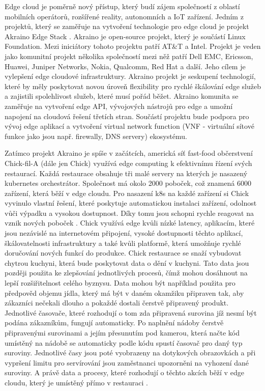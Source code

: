      Edge cloud je poměrně nový přístup, který budí zájem společností z oblastí mobilních operátorů, rozšířené reality, autonomních a IoT zařízení. Jedním z projektů, který se zaměřuje na vytvoření technologie pro edge cloud je projekt Akraino Edge Stack \cite{akraino}. Akraino je open-source projekt, který je součástí Linux Foundation. Mezi iniciátory tohoto projektu patří AT&T a Intel. Projekt je veden jako komunitní projekt několika společností mezi něž patří Dell EMC, Ericsson, Huawei, Juniper Networks, Nokia, Qualcomm, Red Hat a další. Jeho cílem je vylepšení edge cloudové infrastruktury. Akraino projekt je seskupení technologií, které by měly poskytovat novou úroveň flexibility pro rychlé škálování edge služeb a zajistili spolehlivost služeb, které musí pořád běžet. Akraino komunita se zaměřuje na vytvoření edge API, vývojových nástrojů pro edge a umožní napojení na cloudová řešení třetích stran. Součástí projektu bude podpora pro vývoj edge aplikací a vytvoření virtual network function (VNF - virtuální sítové funkce jako jsou např. firewally, DNS servery) ekosystému. \par
         Zatímco projekt Akraino je spíše v začátcích, americká síť fast-food občerstvení Chick-fil-A (dále jen Chick) využívá edge computing k efektivnímu řízení svých restaurací. Každá restaurace obsahuje tři malé servery na kterých je nasazený kubernetes orchestrátor. Společnost má okolo 2000 poboček, což znamená 6000 zařízení, která běží v edge cloudu. Pro nasazení k8s na každé zařízení si Chick vyvinulo vlastní řešení, které poskytuje automatickou instalaci zařízení, odolnost vůči výpadku a vysokou dostupnost. Díky tomu jsou schopni rychle reagovat na vznik nových poboček \cite{chick-1}. Chick využívá edge kvůli nízké latency, aplikacím, které jsou nezávislé na internetovém připojení, vysoké dostupnosti těchto aplikací, škálovatelnosti infrastruktury a také kvůli platformě, která umožňuje rychlé doručování nových funkcí do produkce. Chick restaurace se snaží vybudovat chytrou kuchyni, která bude poskytovat data o dění v kuchyni. Tato data jsou později použita ke zlepšování jednotlivých procesů, čímž mohou dosáhnout na lepší rozšiřitelnost celého byznysu. Data mohou být například použita pro předpověd objemu jídla, který má být v daném okamžiku připraven tak, aby zákazníci nečekali dlouho a pokaždé dostali čerstvě připravený produkt. Jednotlivé časovače, které rozhodují o tom zda připravená surovina jíž nesmí být podána zákazníkům, fungují automaticky. Po naplnění nádoby čerstvě připravenými surovinami a jejím přesunutím pod kamerou, která načte kód umístěný na nádobě se automaticky podle kódu spustí časovač pro daný typ suroviny. Jednotlivé časy jsou poté vyobrazeny na dotykových obrazovkách a při vypršení limitu pro servírování jsou zaměstnanci upozorněni na vyhození dané suroviny. A právě data a procesy, které rozhodují o těchto akcích běží v edge cloudu, který je umístěný přímo v restauraci \cite{chick-3}.
